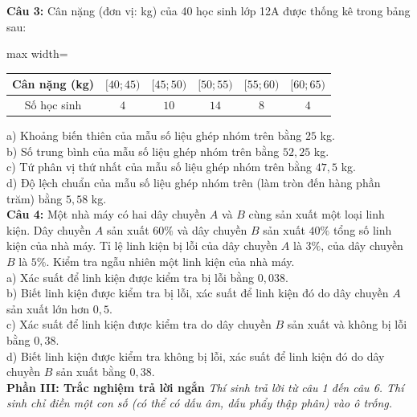\documentclass[12pt,a4paper]{article}
\begin{document}
\noindent \textbf{Câu 3:} Cân nặng (đơn vị: kg) của 40 học sinh lớp 12A được thống kê trong bảng sau:\\
\begin{center}
\begin{adjustbox}{max width=\linewidth}
\begin{tabular}{|c|c|c|c|c|c|}
\hline
Cân nặng (kg) & $[40;45)$ & $[45;50)$ & $[50;55)$ & $[55;60)$ & $[60;65)$\\
\hline
Số học sinh & $4$ & $10$ & $14$ & $8$ & $4$\\
\hline
\end{tabular}
\end{adjustbox}
\end{center}
\noindent a) Khoảng biến thiên của mẫu số liệu ghép nhóm trên bằng $25$ kg.\\

\noindent b) Số trung bình của mẫu số liệu ghép nhóm trên bằng $52{,}25$ kg.\\

\noindent c) Tứ phân vị thứ nhất của mẫu số liệu ghép nhóm trên bằng $47{,}5$ kg.\\

\noindent d) Độ lệch chuẩn của mẫu số liệu ghép nhóm trên (làm tròn đến hàng phần trăm) bằng $5{,}58$ kg.\\

\noindent \textbf{Câu 4:} Một nhà máy có hai dây chuyền $A$ và $B$ cùng sản xuất một loại linh kiện. Dây chuyền $A$ sản xuất $60\%$ và dây chuyền $B$ sản xuất $40\%$ tổng số linh kiện của nhà máy. Tỉ lệ linh kiện bị lỗi của dây chuyền $A$ là $3\%$, của dây chuyền $B$ là $5\%$. Kiểm tra ngẫu nhiên một linh kiện của nhà máy.\\
\noindent a) Xác suất để linh kiện được kiểm tra bị lỗi bằng $0{,}038$.\\

\noindent b) Biết linh kiện được kiểm tra bị lỗi, xác suất để linh kiện đó do dây chuyền $A$ sản xuất lớn hơn $0{,}5$.\\

\noindent c) Xác suất để linh kiện được kiểm tra do dây chuyền $B$ sản xuất và không bị lỗi bằng $0{,}38$.\\

\noindent d) Biết linh kiện được kiểm tra không bị lỗi, xác suất để linh kiện đó do dây chuyền $B$ sản xuất bằng $0{,}38$.\\

\vspace{0.5cm}
\textbf{Phần III: Trắc nghiệm trả lời ngắn} \textit{Thí sinh trả lời từ câu 1 đến câu 6. Thí sinh chỉ điền một con số (có thể có dấu âm, dấu phẩy thập phân) vào ô trống.}
\end{document}
